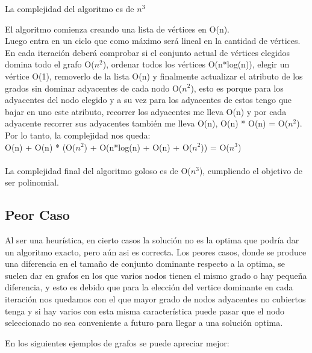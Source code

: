La complejidad del algoritmo es de $n^3$

El algoritmo comienza creando una lista de vértices en O(n).\\
Luego entra en un ciclo que como máximo será lineal en la cantidad de vértices. En cada iteración deberá comprobar si el conjunto actual de vértices elegidos domina todo el grafo O($n^2$), ordenar todos los vértices O(n*log(n)), elegir un vértice O(1), removerlo de la lista O(n) y finalmente actualizar el atributo de los grados sin dominar adyacentes de cada nodo O($n^2$), esto es porque para los adyacentes del nodo elegido y a su vez para los adyacentes de estos tengo que bajar en uno este atributo, recorrer los adyacentes me lleva O(n) y por cada adyacente recorrer sus adyacentes también me lleva O(n), O(n) * O(n) = O($n^2$).\\

Por lo tanto, la complejidad nos queda:\\
O(n) + O(n) * (O($n^2$) + O(n*log(n) + O(n) + O($n^2$)) = O($n^3$)\\\\

La complejidad final del algoritmo goloso es de O($n^3$), cumpliendo el objetivo de ser polinomial.


\subsection{Peor Caso}

Al ser una heurística, en cierto casos la solución no es la optima que podría dar un algoritmo exacto, pero aún asi es correcta.
Los peores casos, donde se produce una diferencia en el tamaño de conjunto dominante respecto a la optima, se suelen dar en grafos en los que varios nodos tienen el mismo grado o hay pequeña diferencia, y esto es debido que para la elección del vertice dominante en cada iteración nos quedamos con el que mayor grado de nodos adyacentes no cubiertos tenga y si hay varios con esta misma característica puede pasar que el nodo seleccionado no sea conveniente a futuro para llegar a una solución optima.

En los siguientes ejemplos de grafos se puede apreciar mejor:

